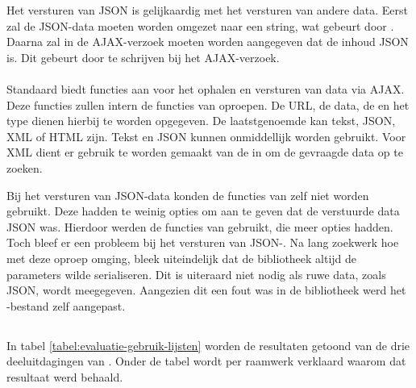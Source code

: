 Het versturen van JSON is gelijkaardig met het versturen van andere data.
Eerst zal de JSON-data moeten worden omgezet naar een string, wat gebeurt door .
Daarna zal in de AJAX-verzoek moeten worden aangegeven  dat de inhoud JSON is.
Dit gebeurt door  te schrijven bij het AJAX-verzoek.

\paragraph{\lungo}
Standaard biedt \lungo{} functies aan voor het ophalen en versturen van data via AJAX.
Deze functies zullen intern de functies van \quo{} oproepen.
De URL, de data, de  en het type dienen hierbij te worden opgegeven.
De laatstgenoemde kan tekst, JSON, XML of HTML zijn.
Tekst en JSON kunnen onmiddellijk worden gebruikt.
Voor XML dient er gebruik te worden gemaakt van de  in \quo{} om de gevraagde data op te zoeken.

Bij het versturen van JSON-data konden de functies van \lungo{} zelf niet worden gebruikt.
Deze hadden te weinig opties om aan te geven dat de verstuurde data JSON was.
Hierdoor werden de functies van \quo{} gebruikt, die meer opties hadden.
Toch bleef er een probleem bij het versturen van JSON-.
Na lang zoekwerk hoe \quo{} met deze oproep omging, bleek uiteindelijk dat de bibliotheek altijd de parameters wilde serialiseren.
Dit is uiteraard niet nodig als ruwe data, zoals JSON, wordt meegegeven.
Aangezien dit een fout was in de bibliotheek werd het \js-bestand zelf aangepast.


\subsection{}
\label{sec:evaluatie-gebruik-lijsten}

In tabel \ref{tabel:evaluatie-gebruik-lijsten} worden de resultaten getoond van de drie deeluitdagingen van .
Onder de tabel wordt per raamwerk verklaard waarom dat resultaat werd behaald.

